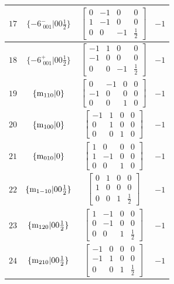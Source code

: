 \documentclass[fleqn,8pt]{jsarticle}
\begin{document}
\begin{longtable}{cccc}
$ 17 $ & $ \{-6^{-}_{\,\,001}|0 0 \frac{1}{2}\} $ & $ \begin{bmatrix} 0 & -1 & 0 & 0 \\ 1 & -1 & 0 & 0 \\ 0 & 0 & -1 & \frac{1}{2} \end{bmatrix} $ & $ -1 $ \\ \hline
$ 18 $ & $ \{-6^{+}_{\,\,001}|0 0 \frac{1}{2}\} $ & $ \begin{bmatrix} -1 & 1 & 0 & 0 \\ -1 & 0 & 0 & 0 \\ 0 & 0 & -1 & \frac{1}{2} \end{bmatrix} $ & $ -1 $ \\ \hline
$ 19 $ & $ \{{\rm m}_{110}|0\} $ & $ \begin{bmatrix} 0 & -1 & 0 & 0 \\ -1 & 0 & 0 & 0 \\ 0 & 0 & 1 & 0 \end{bmatrix} $ & $ -1 $ \\ \hline
$ 20 $ & $ \{{\rm m}_{100}|0\} $ & $ \begin{bmatrix} -1 & 1 & 0 & 0 \\ 0 & 1 & 0 & 0 \\ 0 & 0 & 1 & 0 \end{bmatrix} $ & $ -1 $ \\ \hline
$ 21 $ & $ \{{\rm m}_{010}|0\} $ & $ \begin{bmatrix} 1 & 0 & 0 & 0 \\ 1 & -1 & 0 & 0 \\ 0 & 0 & 1 & 0 \end{bmatrix} $ & $ -1 $ \\ \hline
$ 22 $ & $ \{{\rm m}_{1-10}|0 0 \frac{1}{2}\} $ & $ \begin{bmatrix} 0 & 1 & 0 & 0 \\ 1 & 0 & 0 & 0 \\ 0 & 0 & 1 & \frac{1}{2} \end{bmatrix} $ & $ -1 $ \\ \hline
$ 23 $ & $ \{{\rm m}_{120}|0 0 \frac{1}{2}\} $ & $ \begin{bmatrix} 1 & -1 & 0 & 0 \\ 0 & -1 & 0 & 0 \\ 0 & 0 & 1 & \frac{1}{2} \end{bmatrix} $ & $ -1 $ \\ \hline
$ 24 $ & $ \{{\rm m}_{210}|0 0 \frac{1}{2}\} $ & $ \begin{bmatrix} -1 & 0 & 0 & 0 \\ -1 & 1 & 0 & 0 \\ 0 & 0 & 1 & \frac{1}{2} \end{bmatrix} $ & $ -1 $ \\
\end{longtable}
\end{document}
